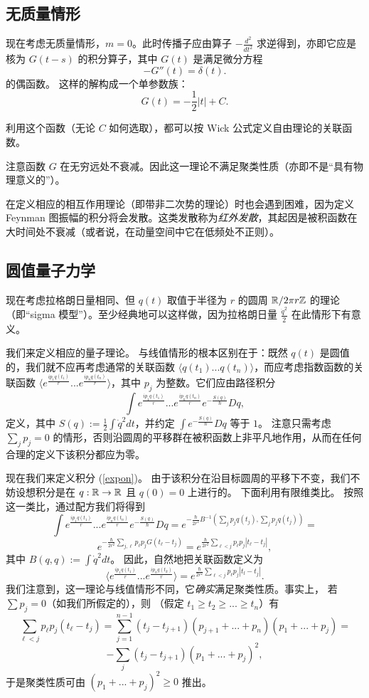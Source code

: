 \subsection{无质量情形} 
现在考虑无质量情形，$m=0$。此时传播子应由算子 $-\frac{d^2}{dt^2}$ 求逆得到，亦即它应是核为 $G(t-s)$ 的积分算子，其中 $G(t)$ 是满足微分方程
$$
-G''(t)=\delta(t).
$$ 
的偶函数。
这样的解构成一个单参数族：
$$
G(t)=-\frac{1}{2}|t|+C.
$$ 

利用这个函数（无论 $C$ 如何选取），都可以按 Wick 公式定义自由理论的关联函数。

注意函数 $G$ 在无穷远处不衰减。因此这一理论不满足聚类性质（亦即不是“具有物理意义的”）。

在定义相应的相互作用理论（即带非二次势的理论）时也会遇到困难，因为定义 Feynman 图振幅的积分将会发散。这类发散称为\emph{红外发散}，其起因是被积函数在大时间处不衰减（或者说，在动量空间中它在低频处不正则）。

\subsection{圆值量子力学}
现在考虑拉格朗日量相同、但 $q(t)$ 取值于半径为 $r$ 的圆周 $\Bbb R/2\pi r\Bbb Z$ 的理论（即“sigma 模型”）。至少经典地可以这样做，因为拉格朗日量 $\frac{\dot{q}^2}{2}$ 在此情形下有意义。

我们来定义相应的量子理论。
与线值情形的根本区别在于：既然 $q(t)$ 是圆值的，我们就不应再考虑通常的关联函数
$\langle q(t_1)...q(t_n)\rangle$，而应考虑指数函数的关联函数
$\langle e^{\frac{ip_1q(t_1)}{r}}...e^{\frac{ip_nq(t_n)}{r}}\rangle$，其中 $p_j$ 为整数。它们应由路径积分
\begin{equation}\label{expon}
\int e^{\frac{ip_1q(t_1)}{r}}...e^{\frac{ip_nq(t_n)}{r}}e^{-\frac{S(q)}{\hbar}}Dq,
\end{equation}
定义，其中 $S(q):=\frac{1}{2}\int \dot{q}^2dt$，并约定 $\int e^{-\frac{S(q)}{\hbar}}Dq$ 等于 $1$。
注意只需考虑 $\sum_j p_j=0$ 的情形，否则沿圆周的平移群在被积函数上非平凡地作用，从而在任何合理的定义下该积分都应为零。

现在我们来定义积分 (\ref{expon})。
由于该积分在沿目标圆周的平移下不变，我们不妨设想积分是在 $q:\Bbb R\to \Bbb R$ 且 $q(0)=0$ 上进行的。
下面利用有限维类比。
按照这一类比，通过配方我们将得到
$$
\int e^{\frac{ip_1q(t_1)}{r}}...e^{\frac{ip_nq(t_n)}{r}}e^{-\frac{S(q)}{\hbar}}Dq=
e^{-\frac{\hbar}{2r^2} B^{-1}(\sum_j p_jq(t_j),\sum_j p_jq(t_j))}=
$$
$$
e^{-\frac{\hbar}{2r^2}\sum_{j,\ell} p_\ell p_j G(t_\ell-t_j)}=
e^{\frac{\hbar}{2r^2}\sum_{\ell<j} p_\ell p_j|t_\ell-t_j|},
$$
其中 $B(q,q):=\int \dot{q}^2dt$。
因此，自然地把关联函数定义为
$$
\langle e^{\frac{ip_1q(t_1)}{r}}...e^{\frac{ip_nq(t_k)}{r}}\rangle
=e^{\frac{\hbar}{2r^2}\sum_{\ell<j} p_\ell p_j|t_l-t_j|}.
$$
我们注意到，这一理论与线值情形不同，它\emph{确实}满足聚类性质。事实上，
若 $\sum p_j=0$（如我们所假定的），则
（假定 $t_1\ge t_2\ge...\ge t_n$）有
$$
\sum_{\ell<j}p_\ell p_j(t_\ell-t_j)=
\sum_{j=1}^{n-1}(t_j-t_{j+1})(p_{j+1}+...+p_n)(p_1+...+p_j)=
$$
$$
-\sum_j (t_j-t_{j+1})(p_1+...+p_j)^2,
$$ 
于是聚类性质可由 $(p_1+...+p_j)^2\ge 0$ 推出。

